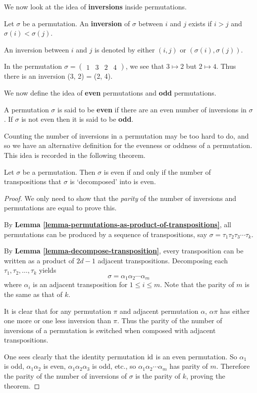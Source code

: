 We now look at the idea of \textbf{inversions} inside permutations.
\begin{definition}
    Let $\sigma$ be a permutation. An \textbf{inversion} of $\sigma$ between $i$ and $j$ exists if $i > j$ and $\sigma(i) < \sigma(j)$.
\end{definition}
An inversion between $i$ and $j$ is denoted by either $(i, j)$ or $(\sigma(i), \sigma(j))$.
\begin{example}
    In the permutation $\sigma = \begin{pmatrix}1 & 3 & 2 & 4\end{pmatrix}$, we see that $3 \mapsto 2$ but $2 \mapsto 4$. Thus there is an inversion (3, 2) = (2, 4).
\end{example}

We now define the idea of \textbf{even} permutations and \textbf{odd} permutations.
\begin{definition}
    A permutation $\sigma$ is said to be \textbf{even} if there are an even number of inversions in $\sigma$. If $\sigma$ is not even then it is said to be \textbf{odd}.
\end{definition}

Counting the number of inversions in a permutation may be too hard to do, and so we have an alternative definition for the evenness or oddness of a permutation. This idea is recorded in the following theorem.

\begin{theorem}\label{thrm-parity-of-permutation}
    Let $\sigma$ be a permutation. Then $\sigma$ is even if and only if the number of transpositions that $\sigma$ is `decomposed' into is even.
\end{theorem}
\begin{proof}
    We only need to show that the \textit{parity} of the number of inversions and permutations are equal to prove this.

    By \textbf{Lemma \ref{lemma-permutations-as-product-of-transpositions}}, all permutations can be produced by a sequence of transpositions, say $\sigma = \tau_1\tau_2\tau_3\cdots\tau_k$.

    By \textbf{Lemma \ref{lemma-decompose-transposition}}, every transposition can be written as a product of $2d - 1$ adjacent transpositions. Decomposing each $\tau_1, \tau_2, \dots, \tau_k$ yields
    \[
        \sigma = \alpha_1\alpha_2\cdots\alpha_m
    \]
    where $\alpha_i$ is an adjacent transposition for $1 \leq i \leq m$. Note that the parity of $m$ is the same as that of $k$.

    It is clear that for any permutation $\pi$ and adjacent permutation $\alpha$, $\alpha\pi$ has either one more or one less inversion than $\pi$. Thus the parity of the number of inversions of a permutation is switched when composed with adjacent transpositions.

    One sees clearly that the identity permutation $\mathrm{id}$ is an even permutation. So $\alpha_1$ is odd, $\alpha_1\alpha_2$ is even, $\alpha_1\alpha_2\alpha_3$ is odd, etc., so $\alpha_1\alpha_2\cdots\alpha_m$ has parity of $m$. Therefore the parity of the number of inversions of $\sigma$ is the parity of $k$, proving the theorem.
\end{proof}


